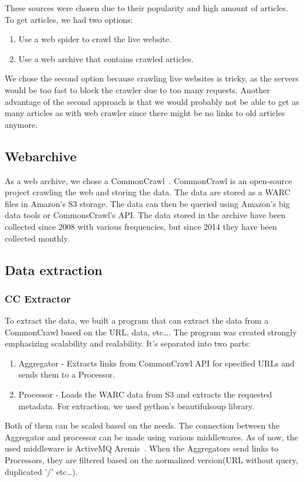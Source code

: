 These sources were chosen due to their popularity and high amount of articles.
To get articles, we had two options:
\begin{enumerate}
    \item Use a web spider to crawl the live website.
    \item Use a web archive that contains crawled articles.
\end{enumerate}
We chose the second option because crawling live websites is tricky,
as the servers would be too fast to block the crawler due to too many requests. Another advantage of the second approach is that we would probably not be able to get as many articles as
with web crawler since there might be no links to old articles anymore.

\subsection{Webarchive}
As a web archive, we chose a CommonCrawl~\cite{CommonCrawl}.
CommonCrawl is an open-source project crawling the web and storing the data.
The data are stored as a WARC files in Amazon's S3 storage.
The data can then be queried using Amazon's big data tools or CommonsCrawl's API.
The data stored in the archive have been collected since 2008 with various frequencies,
but since 2014 they have been collected monthly.

\subsection{Data extraction}
\subsubsection{CC Extractor}
To extract the data, we built a program that can extract the data from a CommonCrawl
based on the URL, data, etc\dots. The program was
created strongly emphasizing scalability and realability.
It's separated into two parts:
\begin{enumerate}
    \item Aggregator -
          Extracts links from CommonCrawl API for specified URLs and sends them to a Processor.
    \item Processor -
          Loads the WARC data from S3 and extracts the requested metadata.
          For extraction, we used python's beautifulsoup library.
\end{enumerate}
Both of them can be scaled based on the needs.
The connection between the Aggregator and processor can be made using various middlewares.
As of now, the used middleware is ActiveMQ Aremis~\cite{ActiveMQ}.
When the Aggregators send links to Processors,
they are filtered based on the normalized version(URL without query, duplicated '/' etc\dots).
